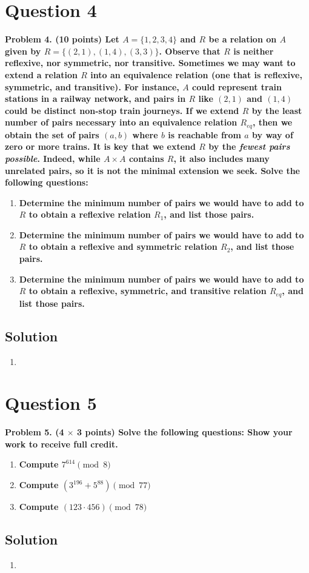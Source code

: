 \documentclass[11pt]{article}
\begin{document}
\clearpage
\section*{Question 4}

    \textbf{Problem 4. (10 points) Let $A = \{1, 2, 3, 4\}$ and $R$ be a relation on $A$ given by $R = \{(2, 1), (1, 4), (3, 3)\}$. Observe that $R$ is neither reflexive, nor symmetric, nor transitive. Sometimes we may want to extend a relation $R$ into an equivalence relation (one that is reflexive, symmetric, and transitive). For instance, $A$ could represent train stations in a railway network, and pairs in $R$ like $(2, 1)$ and $(1, 4)$ could be distinct non-stop train journeys. If we extend $R$ by the least number of pairs necessary into an equivalence relation $R_{eq}$, then we obtain the set of pairs $(a, b)$ where $b$ is reachable from $a$ by way of zero or more trains. It is key that we extend $R$ by the \textit{fewest pairs possible}. Indeed, while $A \times A$ contains $R$, it also includes many unrelated pairs, so it is not the minimal extension we seek. Solve the following questions:}
    \begin{enumerate}[label=(\alph*)]
        \item \textbf{Determine the minimum number of pairs we would have to add to $R$ to obtain a reflexive relation $R_1$, and list those pairs.}
        \item \textbf{Determine the minimum number of pairs we would have to add to $R$ to obtain a reflexive and symmetric relation $R_2$, and list those pairs.}
        \item \textbf{Determine the minimum number of pairs we would have to add to $R$ to obtain a reflexive, symmetric, and transitive relation $R_{eq}$, and list those pairs.}
    \end{enumerate}


    \subsection*{Solution}
    \begin{enumerate}[label=(\alph*)]
        \item 
    \end{enumerate}


\clearpage
\section*{Question 5}

    \textbf{Problem 5. (4 $\times$ 3 points) Solve the following questions: Show your work to receive full credit.}
    \begin{enumerate}[label=(\alph*)]
        \item \textbf{Compute $7^{614} \pmod{8}$}
        \item \textbf{Compute $(3^{196} + 5^{88}) \pmod{77}$}
        \item \textbf{Compute $(123 \cdot 456) \pmod{78}$}
    \end{enumerate}


    \subsection*{Solution}
    \begin{enumerate}[label=(\alph*)]
        \item
    \end{enumerate}
\end{document}
